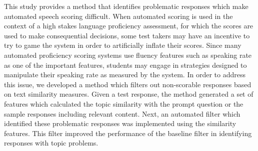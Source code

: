This study provides a method that identifies problematic responses which make automated speech scoring difficult. When automated scoring is used in the context of a high stakes language proficiency assessment, for which the scores are used to make consequential decisions, some test takers may have an incentive to try to game the system in order to artificially inflate their scores. Since many automated proficiency scoring systems use fluency features such as speaking rate as one of the important features, students may engage in strategies designed to manipulate their speaking rate as measured by the system. In order to address this issue, we developed a method which filters out non-scorable responses based on text similarity measures. Given a test response, the method generated a set of features which calculated the topic similarity with the prompt question or the sample responses including relevant content. Next, an automated filter which identified these problematic responses was implemented using the similarity features. This filter improved the performance of the baseline filter in identifying responses with topic problems.
